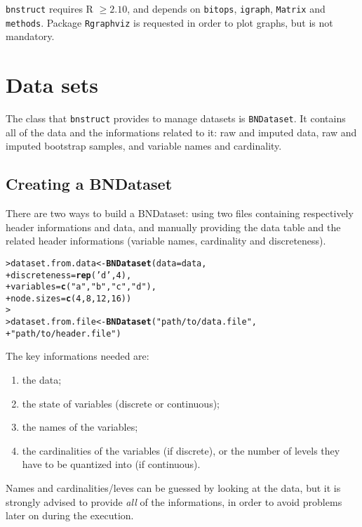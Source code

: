 \documentclass{article}\usepackage[]{graphicx}\usepackage[]{color}
\makeatletter
\newcommand{\hlnum}[1]{\textcolor[rgb]{0.686,0.059,0.569}{#1}}%
\newcommand{\hlstr}[1]{\textcolor[rgb]{0.192,0.494,0.8}{#1}}%
\newcommand{\hlstd}[1]{\textcolor[rgb]{0.345,0.345,0.345}{#1}}%
\newcommand{\hlkwb}[1]{\textcolor[rgb]{0.69,0.353,0.396}{#1}}%
\newcommand{\hlkwc}[1]{\textcolor[rgb]{0.333,0.667,0.333}{#1}}%
\newcommand{\hlkwd}[1]{\textcolor[rgb]{0.737,0.353,0.396}{\textbf{#1}}}%
\newenvironment{kframe}{%
 \def\at@end@of@kframe{}%
 \ifinner\ifhmode%
  \def\at@end@of@kframe{\end{minipage}}%
  \begin{minipage}{\columnwidth}%
 \fi\fi%
 \def\FrameCommand##1{\hskip\@totalleftmargin \hskip-\fboxsep
 \colorbox{shadecolor}{##1}\hskip-\fboxsep
     \hskip-\linewidth \hskip-\@totalleftmargin \hskip\columnwidth}%
 \MakeFramed {\advance\hsize-\width
   \@totalleftmargin\z@ \linewidth\hsize
   \@setminipage}}%
 {\par\unskip\endMakeFramed%
 \at@end@of@kframe}
\newenvironment{knitrout}{}{} %
\newcommand{\Robject}[1]{{\texttt{#1}}}
\newcommand{\Rpackage}[1]{{\texttt{#1}}}
\makeatother
\begin{document}
\Rpackage{bnstruct} requires R $\geq 2.10$,
and depends on \Rpackage{bitops}, \Rpackage{igraph}, \Rpackage{Matrix} and \Rpackage{methods}.
Package \Rpackage{Rgraphviz} is requested in order to plot graphs, but is not mandatory.


\section{Data sets}
The class that \Rpackage{bnstruct} provides to manage datasets is \Robject{BNDataset}.
It contains all of the data and the informations related to it: raw and imputed data, raw and imputed
bootstrap samples, and variable names and cardinality.

\subsection{Creating a BNDataset}
There are two ways to build a BNDataset: using two files containing respectively header informations
and data, and manually providing the data table and the related header informations
(variable names, cardinality and discreteness).

\begin{knitrout}
\color{fgcolor}\begin{kframe}
\begin{alltt}
\hlstd{> }\hlstd{dataset.from.data} \hlkwb{<-} \hlkwd{BNDataset}\hlstd{(}\hlkwc{data} \hlstd{= data,}
\hlstd{+ }                               \hlkwc{discreteness} \hlstd{=} \hlkwd{rep}\hlstd{(}\hlstr{'d'}\hlstd{,}\hlnum{4}\hlstd{),}
\hlstd{+ }                               \hlkwc{variables} \hlstd{=} \hlkwd{c}\hlstd{(}\hlstr{"a"}\hlstd{,} \hlstr{"b"}\hlstd{,} \hlstr{"c"}\hlstd{,} \hlstr{"d"}\hlstd{),}
\hlstd{+ }                               \hlkwc{node.sizes} \hlstd{=} \hlkwd{c}\hlstd{(}\hlnum{4}\hlstd{,}\hlnum{8}\hlstd{,}\hlnum{12}\hlstd{,}\hlnum{16}\hlstd{))}
\hlstd{> }
\hlstd{> }\hlstd{dataset.from.file} \hlkwb{<-} \hlkwd{BNDataset}\hlstd{(}\hlstr{"path/to/data.file"}\hlstd{,}
\hlstd{+ }                               \hlstr{"path/to/header.file"}\hlstd{)}
\end{alltt}
\end{kframe}
\end{knitrout}

The key informations needed are:
\begin{enumerate}
\item the data;
\item the state of variables (discrete or continuous);
\item the names of the variables;
\item the cardinalities of the variables (if discrete), or the number of levels they have to be quantized into
(if continuous). 
\end{enumerate}
Names and cardinalities/leves can be guessed by looking at the data, but it is strongly advised to provide
\textit{all} of the informations, in order to avoid problems later on during the execution.
\end{document}
